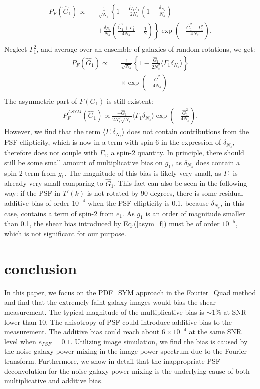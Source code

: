 \documentclass[twocolumn]{aastex62}
\begin{document}
\begin{eqnarray}
P_F(\hat{G}_1)\propto&&\frac{1}{\sqrt{N_s}}\left\{{1+\frac{\hat{G}_1\Gamma_1}{2N_s}\left(1-\frac{\delta_{N_s}}{N_s}\right)}\right.\\ \nonumber
&&\left.{+\frac{\delta_{N_s}}{N_s}\left(\frac{\hat{G}_1^2+\Gamma_1^2}{4N_s}-\frac{1}{2}\right)}\right\}
\exp\left(-\frac{\hat{G}_1^2+\Gamma_1^2}{4N_s}\right). \\ \nonumber
\end{eqnarray} 
Neglect $\Gamma_1^2$, and average over an ensemble of galaxies of random rotations, we get:
\begin{eqnarray}
\bar{P}_F(\hat{G}_1)\propto&&\frac{1}{\sqrt{N_s}}\left\{1-\frac{\hat{G}_1}{2N_s^2}\langle\Gamma_1\delta_{N_s}\rangle\right\}\\ \nonumber
&&\times\exp\left(-\frac{\hat{G}_1^2}{4N_s}\right) \\ \nonumber
\end{eqnarray} 
The asymmetric part of $F(G_1)$ is still existent:
\begin{eqnarray}
\label{asym_f}
\bar{P}_F^{ASYM}(\hat{G}_1)\propto\frac{-\hat{G}_1}{2N_s^2\sqrt{N_s}}\langle\Gamma_1\delta_{N_s}\rangle\exp\left(-\frac{\hat{G}_1^2}{4N_s}\right).
\end{eqnarray} 
However, we find that the term $\langle\Gamma_1\delta_{N_s}\rangle$ does not contain contributions from the PSF ellipticity, which is now in a term with spin-6 in the expression of $\delta_{N_s}$, therefore does not couple with $\Gamma_1$, a spin-2 quantity. In principle, there should still be some small amount of multiplicative bias on $g_1$, as $\delta_{N_s}$ does contain a spin-2 term from $g_1$. The magnitude of this bias is likely very small, as $\Gamma_1$ is already very small comparing to $\hat{G}_1$. This fact can also be seen in the following way: if the PSF in $T'(k)$ is not rotated by 90 degrees, there is some residual additive bias of order $10^{-4}$ when the PSF ellipticity is 0.1, because $\delta_{N_s}$, in this case, contains a term of spin-2 from $e_1$. As $g_1$ is an order of magnitude smaller than 0.1, the shear bias introduced by Eq.(\ref{asym_f}) must be of order $10^{-5}$, which is not significant for our purpose.   


\section{conclusion}
In this paper, we focus on the PDF\_SYM approach in the Fourier\_Quad method and find that the extremely faint galaxy images would bias the shear measurement. The typical magnitude of the multiplicative bias is $\sim1\%$ at SNR lower than $10$. The anisotropy of PSF could introduce additive bias to the measurement. The additive bias could reach about $6\times10^{-4}$ at the same SNR level when $e_{PSF} $ = $0.1$. Utilizing image simulation, we find the bias is caused by the noise-galaxy power mixing in the image power spectrum due to the Fourier transform. Furthermore, we show in detail that the inappropriate PSF deconvolution for the noise-galaxy power mixing is the underlying cause of both multiplicative and additive bias. 
\end{document}
